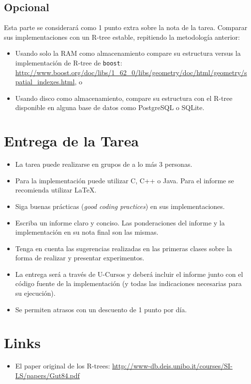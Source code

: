 \documentclass[dcc,uchile]{fcfmcourse}
\begin{document}
\subsection{Opcional}
Esta parte se considerará como 1 punto extra sobre la nota de la tarea. Comparar sus implementaciones con un R-tree estable, repitiendo la metodología anterior:
\begin{itemize}
    \item Usando solo la RAM como almacenamiento compare su estructura versus la implementación de R-tree de \texttt{boost}: \href{http://www.boost.org/doc/libs/1_62_0/libs/geometry/doc/html/geometry/spatial_indexes.html}{http://www.boost.org/doc/libs/1_62_0/libs/geometry/doc/html/geometry/spatial_indexes.html}, o
    \item Usando disco como almacenamiento, compare su estructura con el R-tree disponible en alguna base de datos como PostgreSQL o SQLite.
\end{itemize}
\section{Entrega de la Tarea}
\begin{itemize}
    \item La tarea puede realizarse en grupos de a lo más 3 personas.
    \item Para la implementación puede utilizar C, C++ o Java. Para el informe se recomienda utilizar \LaTeX .
    \item Siga buenas prácticas (\textit{good coding practices}) en sus implementaciones.
    \item Escriba un informe claro y conciso. Las ponderaciones del informe y la implementación en su nota final son las mismas.
    \item Tenga en cuenta las sugerencias realizadas en las primeras clases sobre la forma de realizar y presentar experimentos.
    \item La entrega será a través de U-Cursos y deberá incluir el informe junto con el código fuente de la implementación (y todas las indicaciones necesarias para su ejecución).
    \item Se permiten atrasos con un descuento de 1 punto por día.
\end{itemize}
\section{Links}
\begin{itemize}
    \item El paper original de los R-trees: \href{http://www-db.deis.unibo.it/courses/SI-LS/papers/Gut84.pdf}{http://www-db.deis.unibo.it/courses/SI-LS/papers/Gut84.pdf} 
\end{itemize}
\end{document}
